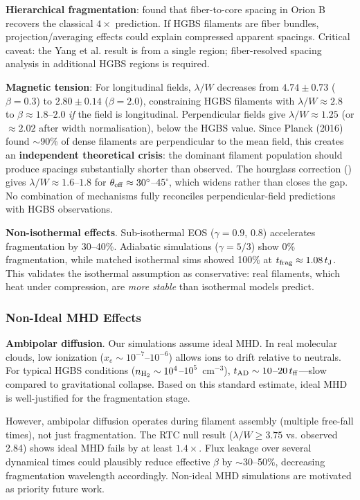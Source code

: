 \documentclass[twocolumn]{mnras}
\begin{document}
\textbf{Hierarchical fragmentation}: \citet{Yang2024} found that fiber-to-core spacing in Orion B recovers the classical $4\times$ prediction. If HGBS filaments are fiber bundles, projection/averaging effects could explain compressed apparent spacings. Critical caveat: the Yang et al. result is from a single region; fiber-resolved spacing analysis in additional HGBS regions is required.

\textbf{Magnetic tension}: For longitudinal fields, $\lambda/W$ decreases from $4.74 \pm 0.73$ ($\beta = 0.3$) to $2.80 \pm 0.14$ ($\beta = 2.0$), constraining HGBS filaments with $\lambda/W \approx 2.8$ to $\beta \approx 1.8$--$2.0$ \textit{if} the field is longitudinal. Perpendicular fields give $\lambda/W \approx 1.25$ (or $\approx 2.02$ after width normalisation), below the HGBS value. Since Planck (2016) found $\sim$90\% of dense filaments are perpendicular to the mean field, this creates an \textbf{independent theoretical crisis}: the dominant filament population should produce spacings substantially shorter than observed. The hourglass correction (\citet{Jadhav2026}) gives $\lambda/W \approx 1.6$--$1.8$ for $\theta_{\rm eff} \approx 30^{\circ}$--$45^{\circ}$, which widens rather than closes the gap. No combination of mechanisms fully reconciles perpendicular-field predictions with HGBS observations.

\textbf{Non-isothermal effects}. Sub-isothermal EOS ($\gamma = 0.9$, $0.8$) accelerates fragmentation by 30--40\%. Adiabatic simulations ($\gamma = 5/3$) show 0\% fragmentation, while matched isothermal sims showed 100\% at $t_{\rm frag} \approx 1.08\,t_{\rm J}$. This validates the isothermal assumption as conservative: real filaments, which heat under compression, are {\it more stable} than isothermal models predict.

\subsubsection{Non-Ideal MHD Effects}

\textbf{Ambipolar diffusion}. Our simulations assume ideal MHD. In real molecular clouds, low ionization ($x_e \sim 10^{-7}$--$10^{-6}$) allows ions to drift relative to neutrals. For typical HGBS conditions ($n_{\rm H_2} \sim 10^4$--$10^5$~cm$^{-3}$), $t_{\rm AD} \sim 10$--$20\,t_{\rm ff}$---slow compared to gravitational collapse. Based on this standard estimate, ideal MHD is well-justified for the fragmentation stage.

However, ambipolar diffusion operates during filament assembly (multiple free-fall times), not just fragmentation. The RTC null result ($\lambda/W \geq 3.75$ vs. observed 2.84) shows ideal MHD fails by at least $1.4\times$. Flux leakage over several dynamical times could plausibly reduce effective $\beta$ by $\sim$30--50\%, decreasing fragmentation wavelength accordingly. Non-ideal MHD simulations are motivated as priority future work.
\end{document}
